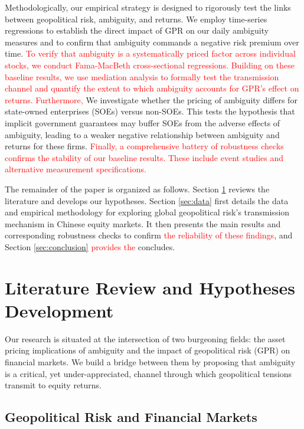 \documentclass[preprint,12pt,authoryear]{elsarticle}
\begin{document}
Methodologically, our empirical strategy is designed to rigorously test the links between geopolitical risk, ambiguity, and returns. We employ time-series regressions to establish the direct impact of GPR on our daily ambiguity measures and to confirm that ambiguity commands a negative risk premium over time. \textcolor{red}{To verify that ambiguity is a systematically priced factor across individual stocks, we conduct Fama-MacBeth cross-sectional regressions. Building on these baseline results, we use mediation analysis to formally test the transmission channel and quantify the extent to which ambiguity accounts for GPR's effect on returns. Furthermore,} We investigate whether the pricing of ambiguity differs for state-owned enterprises (SOEs) versus non-SOEs. This tests the hypothesis that implicit government guarantees may buffer SOEs from the adverse effects of ambiguity, leading to a weaker negative relationship between ambiguity and returns for these firms. \textcolor{red}{Finally, a comprehensive battery of robustness checks confirms the stability of our baseline results. These include event studies and alternative measurement specifications.}

The remainder of the paper is organized as follows. Section \ref{sec:literature} reviews the literature and develops our hypotheses. Section \ref{sec:data} first details the data and empirical methodology for exploring global geopolitical risk’s transmission mechanism in Chinese equity markets. It then presents the main results and corresponding robustness checks to confirm \textcolor{red}{the reliability of these findings}, and Section \ref{sec:conclusion} \textcolor{red}{provides the} concludes.

\section{Literature Review and Hypotheses Development}
\label{sec:literature}

Our research is situated at the intersection of two burgeoning fields: the asset pricing implications of ambiguity and the impact of geopolitical risk (GPR) on financial markets. We build a bridge between them by proposing that ambiguity is a critical, yet under-appreciated, channel through which geopolitical tensions transmit to equity returns.

\subsection{Geopolitical Risk and Financial Markets}
\end{document}
